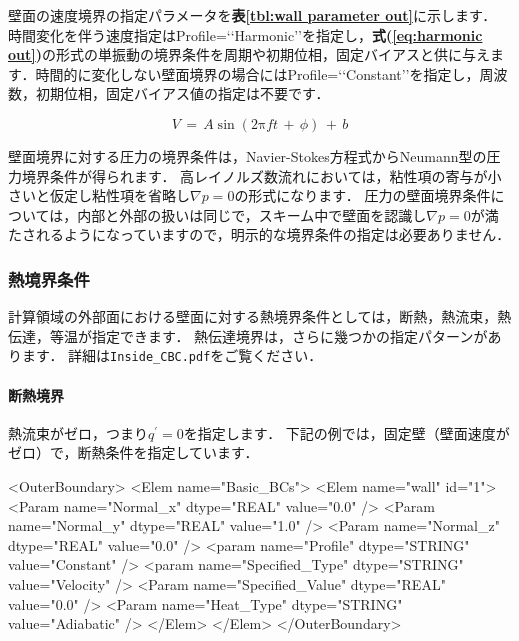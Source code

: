 壁面の速度境界の指定パラメータを\textbf{表\ref{tbl:wall parameter out}}に示します．
時間変化を伴う速度指定はProfile=\lq\lq Harmonic\rq\rq を指定し，\textbf{式(\ref{eq:harmonic out})}の形式の単振動の境界条件を周期や初期位相，固定バイアスと供に与えます．時間的に変化しない壁面境界の場合にはProfile=\lq\lq Constant\rq\rq を指定し，周波数，初期位相，固定バイアス値の指定は不要です．

\begin{equation}
V \,{=}\, A \sin \left( 2 \mathrm{\pi} ft \,+\, \phi \right) \,+\, b
\label{eq:harmonic out}
\end{equation}


壁面境界に対する圧力の境界条件は，Navier-Stokes方程式からNeumann型の圧力境界条件が得られます．
高レイノルズ数流れにおいては，粘性項の寄与が小さいと仮定し粘性項を省略し$\nabla p=0$の形式になります．
圧力の壁面境界条件については，内部と外部の扱いは同じで，スキーム中で壁面を認識し$\nabla p=0$が満たされるようになっていますので，明示的な境界条件の指定は必要ありません．

%
\subsubsection{熱境界条件}
計算領域の外部面における壁面に対する熱境界条件としては，断熱，熱流束，熱伝達，等温が指定できます．
熱伝達境界は，さらに幾つかの指定パターンがあります．
詳細は\verb|Inside_CBC.pdf|をご覧ください．

%
\paragraph{断熱境界}
熱流束がゼロ，つまり$q^{\prime}=0$を指定します．
下記の例では，固定壁（壁面速度がゼロ）で，断熱条件を指定しています．

{\small
\begin{program}
<OuterBoundary>
  <Elem name="Basic_BCs">
    <Elem name="wall" id="1">
      <Param name="Normal_x"        dtype="REAL"   value="0.0" />
      <Param name="Normal_y"        dtype="REAL"   value="1.0" />
      <Param name="Normal_z"        dtype="REAL"   value="0.0" />
      <param name="Profile"         dtype="STRING" value="Constant" />
      <param name="Specified_Type"  dtype="STRING" value="Velocity" />
      <Param name="Specified_Value" dtype="REAL"   value="0.0" />
      <Param name="Heat_Type"       dtype="STRING" value="Adiabatic" />
    </Elem>
  </Elem>
</OuterBoundary>
\end{program}
}

